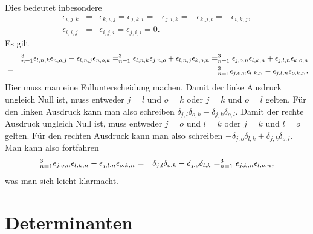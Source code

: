 \documentclass{book}
\let\sum\relax
\DeclareMathOperator*{\sum}{\raisebox{-3.5pt}{\scalebox{2}{\rotatebox{1}{{\bask Σ}}}}}
\begin{document}
%
Dies bedeutet inbesondere
%
\begin{eqnarray}
\epsilon_{i, j, k} & = & \epsilon_{k, i, j} = \epsilon_{j, k, i} = -\epsilon_{j, i, k} = -\epsilon_{k, j, i} = -\epsilon_{i, k, j},\\
\epsilon_{i, i, j} & = & \epsilon_{i, j, i} = \epsilon_{j, i, i} = 0. 
\end{eqnarray}
%
Es gilt
%
\begin{eqnarray}
&&\sum_{n = 1}^{3}\epsilon_{l, n, k}\epsilon_{n, o, j} - \epsilon_{l, n, j}\epsilon_{n, o, k} = \sum_{n = 1}^{3}\epsilon_{l, n, k}\epsilon_{j, n, o} + \epsilon_{l, n, j}\epsilon_{k, o, n} = \sum_{n = 1}^{3}\epsilon_{j, o, n}\epsilon_{l, k, n} + \epsilon_{j, l, n}\epsilon_{k, o, n}\nonumber\\
& = & \sum_{n = 1}^{3}\epsilon_{j, o, n}\epsilon_{l, k, n} - \epsilon_{j, l, n}\epsilon_{o, k, n}.\label{eq:levi-civita_prop_1}
\end{eqnarray}
%
Hier muss man eine Fallunterscheidung machen. Damit der linke Ausdruck ungleich Null ist, muss entweder $j = l$ und $o = k$ oder $j = k$ und $o = l$ gelten. Für den linken Ausdruck kann man also schreiben $\delta_{j, l}\delta_{o, k} - \delta_{j,k}\delta_{o,l}$. Damit der rechte Ausdruck ungleich Null ist, muss entweder $j = o$ und $l = k$ oder $j = k$ und $l = o$ gelten. Für den rechten Ausdruck kann man also schreiben $-\delta_{j, o}\delta_{l, k} + \delta_{j,k}\delta_{o,l}$. Man kann also fortfahren
%
\begin{eqnarray}
\sum_{n = 1}^{3}\epsilon_{j, o, n}\epsilon_{l, k, n} - \epsilon_{j, l, n}\epsilon_{o, k, n} & = & \delta_{j, l}\delta_{o, k} - \delta_{j, o}\delta_{l, k} = \sum_{n = 1}^{3}\epsilon_{j, k, n}\epsilon_{l, o, n}, 
\end{eqnarray}
%
was man sich leicht klarmacht.

\section{Determinanten}
\label{sec:determinanten}
\end{document}
